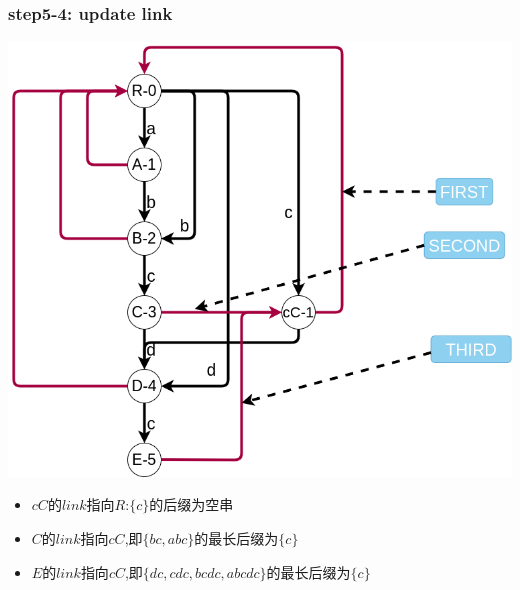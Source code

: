 \documentclass{article}
\begin{document}
\subsubsection{step5-4: update link}
\includegraphics[scale=0.5]{step54.png} \par
\begin{itemize}
	\item $cC$的$link$指向$R$:$\{c\}$的后缀为空串
	\item $C$的$link$指向$cC$,即$\{bc,abc\}$的最长后缀为$\{c\}$
	\item $E$的$link$指向$cC$,即$\{dc,cdc,bcdc,abcdc\}$的最长后缀为$\{c\}$
\end{itemize}
\end{document}
